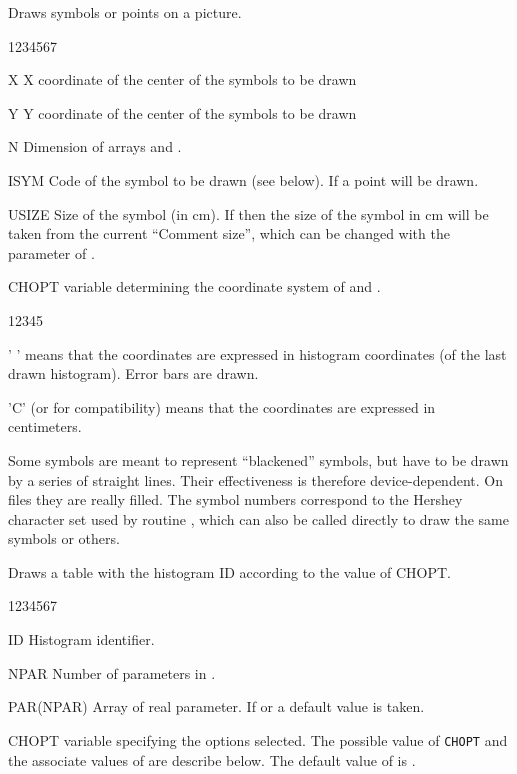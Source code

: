 \Action
Draws symbols or points on a picture.
\Pdesc
\begin{DLtt}{1234567}
\item[X]     X coordinate of the center of the symbols to be drawn
\item[Y]     Y coordinate of the center of the symbols to be drawn
\item[N]     Dimension of arrays  and .
\item[ISYM]  Code of the symbol to be drawn (see below). If  a 
             point will be drawn.
\item[USIZE] Size of the symbol (in cm). If  then the size of 
             the symbol in cm will be taken from the current ``Comment size'', 
             which can be changed with the parameter  of 
             .
\item[CHOPT] \CHARACTER{} variable determining the coordinate system of 
             and .
\begin{DLtt}{12345}
   \item[' '] means that the coordinates are expressed in histogram coordinates
              (of the last drawn histogram). Error bars are drawn.
   \item['C'] (or  for compatibility) means that the coordinates are
              expressed in centimeters.
\end{DLtt}
\end{DLtt}
\Remark
Some symbols are meant to represent ``blackened'' symbols, but have to be drawn
by a series of straight lines. Their effectiveness is therefore 
device-dependent. On \PS{} files they are really filled. The symbol numbers 
correspond to the Hershey character set used by \HIGZ{} routine ,
which can also be called directly to draw the same symbols or others.


\Action
Draws a table with the histogram ID according to the value of CHOPT.
\Pdesc
\begin{DLtt}{1234567}
\item[ID]        Histogram identifier.
\item[NPAR]      Number of parameters in .
\item[PAR(NPAR)] Array of real parameter. If  or  a
                 default value is taken.
\item[CHOPT]     \CHARACTER{} variable specifying the options selected. The
                 possible value of {\tt CHOPT} and the associate values of
                  are describe below. The default value of 
                 is .
\end{DLtt}

